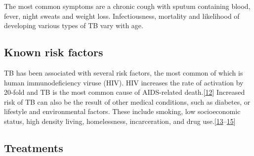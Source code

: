 \documentclass[11pt,twoside]{bristolthesis}
\begin{document}
  The most common symptoms are a chronic cough with sputum containing blood, fever, night sweats and weight loss. Infectiousness, mortality and likelihood of developing various types of TB vary with age.
  
  \hypertarget{known-risk-factors}{%
  \subsection{Known risk factors}\label{known-risk-factors}}
  
  TB has been associated with several risk factors, the most common of which is human immunodeficiency viruse (HIV). HIV increases the rate of activation by 20-fold and TB is the most common cause of AIDS-related death.{[}\protect\hyperlink{ref-Rottenberg2012}{12}{]} Increased risk of TB can also be the result of other medical conditions, such as diabetes, or lifestyle and environmental factors. These include smoking, low socioeconomic status, high density living, homelessness, incarceration, and drug use.{[}\protect\hyperlink{ref-Bhatti1995}{13}--\protect\hyperlink{ref-Story2007}{15}{]}
  
  \hypertarget{treatments}{%
  \subsection{Treatments}\label{treatments}}
  
\end{document}
